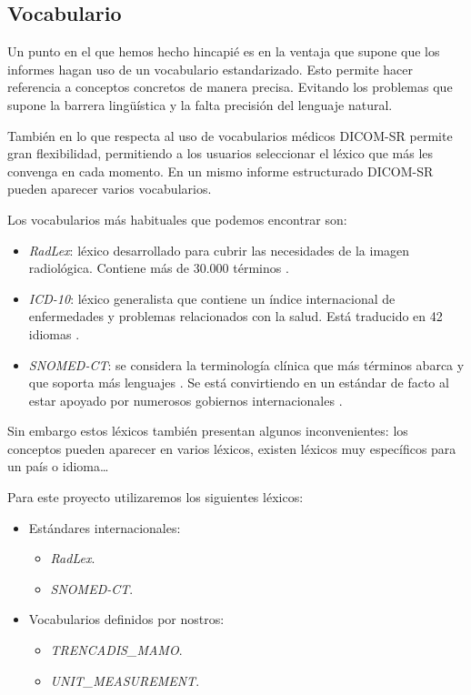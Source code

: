 \subsection{Vocabulario}\label{dicomsr:vocabulario}
Un punto en el que hemos hecho hincapié es en la ventaja que supone que los informes hagan uso de un vocabulario estandarizado. Esto permite hacer referencia a conceptos concretos de manera precisa. Evitando los problemas que supone la barrera lingüística y la falta precisión del lenguaje natural.\medskip\par
También en lo que respecta al uso de vocabularios médicos DICOM-SR permite gran flexibilidad, permitiendo a los usuarios seleccionar el léxico que más les convenga en cada momento. En un mismo informe estructurado DICOM-SR pueden aparecer varios vocabularios.\par
Los vocabularios más habituales que podemos encontrar son: 
\begin{itemize}
	\item \emph{RadLex}: léxico desarrollado para cubrir las necesidades de la imagen radiológica. Contiene más de 30.000 términos \cite{langlotz2006radlex}.
	\item \emph{ICD-10}: léxico generalista que contiene un índice internacional de enfermedades y problemas relacionados con la salud. Está traducido en 42 idiomas \cite{world2004icd}.
	\item \emph{SNOMED-CT}: se considera la terminología clínica que más términos abarca y que soporta más lenguajes \cite{stearns2001snomed}. Se está convirtiendo en un estándar de facto al estar apoyado por numerosos gobiernos internacionales \cite{snomed-gov}.
\end{itemize}
\medskip\par
Sin embargo estos léxicos también presentan algunos inconvenientes: los conceptos pueden aparecer en varios léxicos, existen léxicos muy específicos para un país o idioma\ldots\medskip\par
Para este proyecto utilizaremos los siguientes léxicos:
\begin{itemize}
 \item Estándares internacionales:
 \begin{itemize} 
  \item \emph{RadLex}. 
  \item \emph{SNOMED-CT}.
 \end{itemize}
 \item Vocabularios definidos por nostros:
 \begin{itemize} 
  \item \emph{TRENCADIS\_MAMO}.
  \item \emph{UNIT\_MEASUREMENT}.
 \end{itemize}
 \end{itemize}
  \par
	
